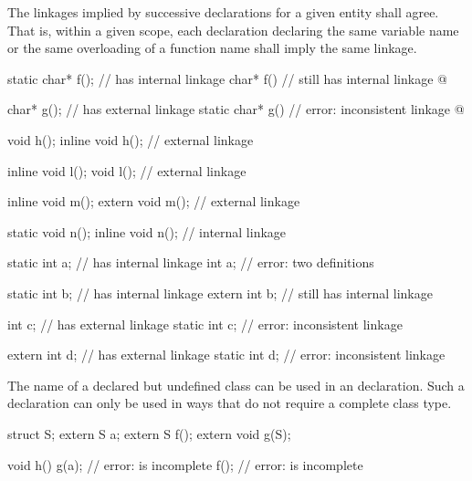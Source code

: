 \pnum
The linkages implied by successive declarations for a given entity shall
agree. That is, within a given scope, each declaration declaring the
same variable name or the same overloading of a function name shall imply
the same linkage.
\begin{example}
\begin{codeblock}
static char* f();               //  has internal linkage
char* f()                       //  still has internal linkage
  { @\commentellip@ }

char* g();                      //  has external linkage
static char* g()                // error: inconsistent linkage
  { @\commentellip@ }

void h();
inline void h();                // external linkage

inline void l();
void l();                       // external linkage

inline void m();
extern void m();                // external linkage

static void n();
inline void n();                // internal linkage

static int a;                   //  has internal linkage
int a;                          // error: two definitions

static int b;                   //  has internal linkage
extern int b;                   //  still has internal linkage

int c;                          //  has external linkage
static int c;                   // error: inconsistent linkage

extern int d;                   //  has external linkage
static int d;                   // error: inconsistent linkage
\end{codeblock}
\end{example}

\pnum
{}%
The name of a declared but undefined class can be used in an
 declaration. Such a declaration can only be used in ways
that do not require a complete class type.
\begin{example}
\begin{codeblock}
struct S;
extern S a;
extern S f();
extern void g(S);

void h() {
  g(a);                         // error:  is incomplete
  f();                          // error:  is incomplete
}
\end{codeblock}
\end{example}

